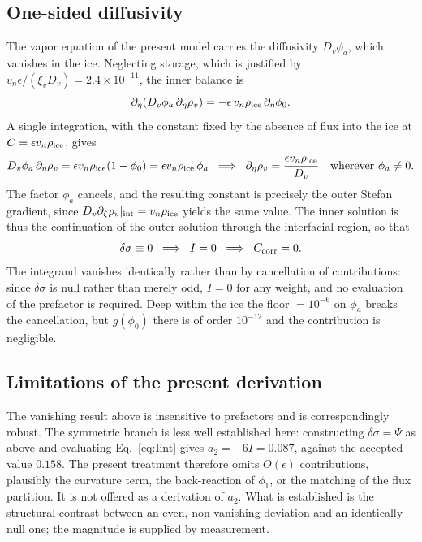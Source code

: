 \subsection{One-sided diffusivity}
The vapor equation of the present model carries the diffusivity $D_v\phi_a$, which vanishes
in the ice. Neglecting storage, which is justified by
$v_n\epsilon/(\xi_v D_v)=2.4\times10^{-11}$, the inner balance is
\begin{equation}
\partial_\eta\!\left(D_v\phi_a\,\partial_\eta\rho_v\right)
=-\epsilon\,v_n\rho_{\rm ice}\,\partial_\eta\phi_0 .
\end{equation}
A single integration, with the constant fixed by the absence of flux into the ice at
$C=\epsilon v_n\rho_{\rm ice}$, gives
\begin{equation}
D_v\phi_a\,\partial_\eta\rho_v=\epsilon v_n\rho_{\rm ice}(1-\phi_0)
=\epsilon v_n\rho_{\rm ice}\,\phi_a
\;\;\Longrightarrow\;\;
\partial_\eta\rho_v=\frac{\epsilon v_n\rho_{\rm ice}}{D_v}
\quad\text{wherever }\phi_a\neq0 .
\end{equation}
The factor $\phi_a$ cancels, and the resulting constant is precisely the outer Stefan
gradient, since $D_v\partial_\zeta\rho_v|_{\rm int}=v_n\rho_{\rm ice}$ yields the same
value. The inner solution is thus the continuation of the outer solution through the
interfacial region, so that
\begin{equation}
\delta\sigma\equiv0
\;\;\Longrightarrow\;\; I=0
\;\;\Longrightarrow\;\; C_{\rm corr}=0 .
\end{equation}
The integrand vanishes identically rather than by cancellation of contributions: since
$\delta\sigma$ is null rather than merely odd, $I=0$ for any weight, and no evaluation of
the prefactor is required. Deep within the ice the floor $=10^{-6}$ on
$\phi_a$ breaks the cancellation, but $g(\phi_0)$ there is of order $10^{-12}$ and the
contribution is negligible.

\subsection{Limitations of the present derivation}
The vanishing result above is insensitive to prefactors and is correspondingly robust. The
symmetric branch is less well established here: constructing $\delta\sigma=\Psi$ as above
and evaluating Eq.~\eqref{eq:Iint} gives $a_2=-6I=0.087$, against the accepted value
$0.158$. The present treatment therefore omits $O(\epsilon)$ contributions, plausibly the
curvature term, the back-reaction of $\phi_1$, or the matching of the flux partition. It is
not offered as a derivation of $a_2$. What is established is the structural contrast
between an even, non-vanishing deviation and an identically null one; the magnitude is
supplied by measurement.


